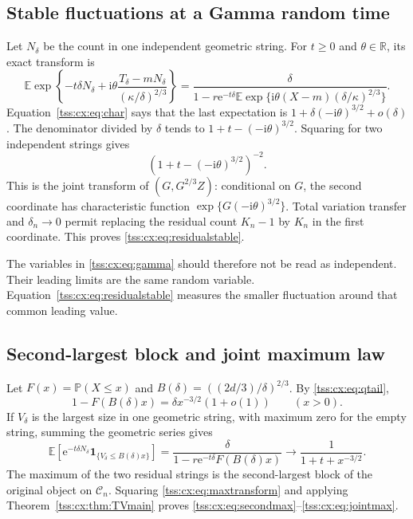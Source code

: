 \documentclass[11pt]{article}
\theoremstyle{remark}\newtheorem{remark}[theorem]{Remark}
\theoremstyle{definition}\newtheorem{definition}[theorem]{Definition}
\newcommand{\ii}{\mathrm i}
\newcommand{\e}{\mathrm e}
\newcommand{\E}{\mathbb E}
\newcommand{\Prob}{\mathbb P}
\newcommand{\R}{\mathbb R}
\newcommand{\ind}{\mathbf 1}
\newcommand{\Cev}{\mathcal C_n}
\begin{document}
\subsection{Stable fluctuations at a Gamma random time}
Let $N_\delta$ be the count in one independent geometric string.
For $t\ge0$ and $\theta\in\R$, its exact transform is
\begin{equation}\label{tss:cx:eq:geomtransform}
 \E\exp\left\{-t\delta N_\delta+
  \ii\theta\frac{T_\delta-mN_\delta}{(\kappa/\delta)^{2/3}}\right\}
 =\frac{\delta}{
  1-r\e^{-t\delta}
  \E\exp\{\ii\theta(X-m)(\delta/\kappa)^{2/3}\}}.
\end{equation}
Equation~\eqref{tss:cx:eq:char} says that the last expectation is
$1+\delta(-\ii\theta)^{3/2}+o(\delta)$. The denominator divided by
$\delta$ tends to $1+t-(-\ii\theta)^{3/2}$. Squaring for two
independent strings gives
\begin{equation}\label{tss:cx:eq:mixedtransform}
 \left(1+t-(-\ii\theta)^{3/2}\right)^{-2}.
\end{equation}
This is the joint transform of $(G,G^{2/3}Z)$: conditional on $G$,
the second coordinate has characteristic function
$\exp\{G(-\ii\theta)^{3/2}\}$. Total variation transfer and
$\delta_n\to0$ permit replacing the residual count $K_n-1$ by $K_n$
in the first coordinate. This proves \eqref{tss:cx:eq:residualstable}.

The variables in \eqref{tss:cx:eq:gamma} should therefore not be read as
independent. Their leading limits are the same random variable.
Equation~\eqref{tss:cx:eq:residualstable} measures the smaller fluctuation
around that common leading value.

\subsection{Second-largest block and joint maximum law}
Let $F(x)=\Prob(X\le x)$ and
$B(\delta)=((2d/3)/\delta)^{2/3}$. By \eqref{tss:cx:eq:qtail},
\begin{equation}\label{tss:cx:eq:tailB}
 1-F(B(\delta)x)=\delta x^{-3/2}(1+o(1))
 \qquad(x>0).
\end{equation}
If $V_\delta$ is the largest size in one geometric string, with
maximum zero for the empty string, summing the geometric series gives
\begin{equation}\label{tss:cx:eq:maxtransform}
 \E[\e^{-t\delta N_\delta}\ind_{\{V_\delta\le B(\delta)x\}}]
 =\frac{\delta}{1-r\e^{-t\delta}F(B(\delta)x)}
 \longrightarrow\frac1{1+t+x^{-3/2}}.
\end{equation}
The maximum of the two residual strings is the second-largest block
of the original object on $\Cev$. Squaring \eqref{tss:cx:eq:maxtransform}
and applying Theorem~\ref{tss:cx:thm:TVmain} proves
\eqref{tss:cx:eq:secondmax}--\eqref{tss:cx:eq:jointmax}.
\end{document}
